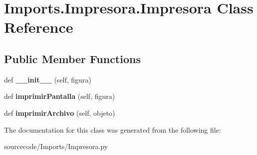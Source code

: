 \hypertarget{class_imports_1_1_impresora_1_1_impresora}{}\section{Imports.\+Impresora.\+Impresora Class Reference}
\label{class_imports_1_1_impresora_1_1_impresora}
\subsection*{Public Member Functions}
\begin{DoxyCompactItemize}
\item 
\mbox{\label{class_imports_1_1_impresora_1_1_impresora_acb8b9c99498daef1583b6de79ae200f2}} 
def {\bfseries \+\_\+\+\_\+init\+\_\+\+\_\+} (self, figura)
\item 
\mbox{\label{class_imports_1_1_impresora_1_1_impresora_aae9abb46f5f8829b6ca09ca75f7c1de3}} 
def {\bfseries imprimir\+Pantalla} (self, figura)
\item 
\mbox{\label{class_imports_1_1_impresora_1_1_impresora_af806c391a24ab629fa25764c4c840f08}} 
def {\bfseries imprimir\+Archivo} (self, objeto)
\end{DoxyCompactItemize}


The documentation for this class was generated from the following file\+:\begin{DoxyCompactItemize}
\item 
sourcecode/\+Imports/Impresora.\+py\end{DoxyCompactItemize}
